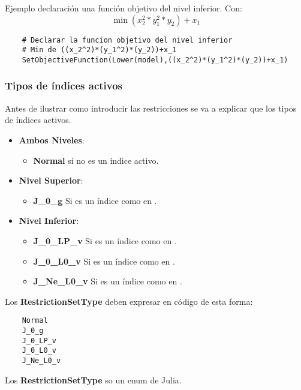 Ejemplo declaración una función objetivo del nivel inferior.
Con: $$\min (x_2^2*y_1^2*y_2)+x_1$$
\begin{lstlisting}
    # Declarar la funcion objetivo del nivel inferior
    # Min de ((x_2^2)*(y_1^2)*(y_2))+x_1
    SetObjectiveFunction(Lower(model),((x_2^2)*(y_1^2)*(y_2))+x_1)
\end{lstlisting}

\subsubsection{Tipos de índices activos}
Antes de ilustrar como introducir las restricciones se va a explicar 
que los tipos de índices activos.

\begin{itemize}
    \item \textbf{Ambos Niveles}:
        \begin{itemize}
            \item \textbf{Normal} si no es un índice activo.
        \end{itemize}
    \item \textbf{Nivel Superior}:
     \begin{itemize}
        \item \textbf{J\_0\_g} Si es un índice como en .
     \end{itemize}
    \item \textbf{Nivel Inferior}:
    \begin{itemize}
        \item \textbf{J\_0\_LP\_v} Si es un índice como en .
        \item  \textbf{J\_0\_L0\_v} Si es un índice como en .
        \item  \textbf{J\_Ne\_L0\_v} Si es un índice como en .
    \end{itemize}
\end{itemize}

Los \textbf{RestrictionSetType} deben expresar en código de esta forma:
\begin{lstlisting}
    Normal 
    J_0_g 
    J_0_LP_v
    J_0_L0_v
    J_Ne_L0_v
\end{lstlisting}

Los \textbf{RestrictionSetType} so un enum de Julia.


